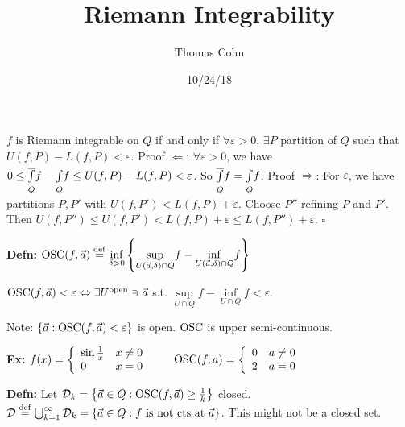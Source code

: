 \documentclass[10pt,letterpaper]{article}
\author{Thomas Cohn}
\title{Riemann Integrability}
\date{10/24/18} %
\newcommand{\n}{\hfill\break}
\newcommand{\defn}[1]{\par\noindent\settowidth{\hangindent}{\textbf{Defn: }}\textbf{Defn: }#1\n}
\newcommand{\ex}[1]{\par\noindent\settowidth{\hangindent}{\textbf{Ex: }}\textbf{Ex: }#1\n}
\newcommand{\proven}{\;$\square$\n}
\newcommand{\ptxt}[1]{\textrm{\textnormal{#1}}}
\newcommand{\set}[1]{\left\{#1\right\}}
\renewcommand{\epsilon}{\varepsilon}
\newcommand{\lint}[2]{\underset{#1}{\overset{#2}{{\color{black}\underline{{\color{white}\overline{{\color{black}\int}}\color{black}}}}}}}
\newcommand{\uint}[2]{\underset{#1}{\overset{#2}{{\color{white}\underline{{\color{black}\overline{{\color{black}\int}}\color{black}}}}}}}
\newcommand{\st}{s.t.}
\begin{document}
\maketitle
\setlength\RaggedRightParindent{\parindent}
\RaggedRight

\par\noindent $f$ is Riemann integrable on $Q$ if and only if $\forall\epsilon>0$, $\exists{}P$ partition of $Q$ such that $U(f,P)-L(f,P)<\epsilon$.\n
Proof $\Leftarrow$: $\forall\epsilon>0$, we have $0\le\uint{Q}{}f-\lint{Q}{}f\le{}U(f,P)-L(f,P)<\epsilon$. So $\uint{Q}{}f=\lint{Q}{}f$.\n
Proof $\Rightarrow$: For $\epsilon$, we have partitions $P,P'$ with $U(f,P')<L(f,P)+\epsilon$. Choose $P''$ refining $P$ and $P'$. Then $U(f,P'')\le{}U(f,P')<L(f,P)+\epsilon\le{}L(f,P'')+\epsilon$.\n
\proven

\newcommand{\OSC}{\ptxt{OSC}}
\defn{$\OSC(f,\vec{a})\overset{\ptxt{def}}{=}\underset{\delta>0}{\inf}\set{\underset{U(\vec{a},\delta)\cap{}Q}{\sup}f-\underset{U(\vec{a},\delta)\cap{}Q}{\inf}f}$}

\par\noindent $\OSC(f,\vec{a})<\epsilon\Leftrightarrow\exists{}U^{\ptxt{open}}\ni\vec{a}$ \st{} $\underset{U\cap{}Q}{\sup}f-\underset{U\cap{}Q}{\inf}f<\epsilon$.\n

\par\noindent Note: $\set{\vec{a}:\OSC(f,\vec{a})<\epsilon}$ is open. $\OSC$ is upper semi-continuous.\n

\ex{$f(x)=\left\{\begin{array}{ll}\sin\frac{1}{x} & x\ne{}0\\ 0 & x=0\end{array}\right.\qquad\OSC(f,a)=\left\{\begin{array}{ll}0 & a\ne{}0\\ 2 & a=0\end{array}\right.$}

\defn{Let $\mathcal{D}_{k}=\set{\vec{a}\in{}Q:\OSC(f,\vec{a})\ge\frac{1}{k}}$ closed. $\mathcal{D}\overset{\ptxt{def}}{=}\bigcup_{k=1}^{\infty}\mathcal{D}_{k}=\set{\vec{a}\in{}Q:f\ptxt{ is not cts at }\vec{a}}$. This might not be a closed set.}
\end{document}
